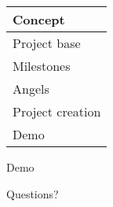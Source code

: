 \documentclass{beamer}
\begin{document}
\begin{frame}
	\begin{tabularx}{\textwidth}{X}
		\hline
		Concept\\
		\hline
		Project base\\
		\hline
		Milestones\\
		\hline
		Angels\\
		\hline
		Project creation\\
		\hline
		\rowcolor{hcolor}
		Demo\\
		\hline
	\end{tabularx}
\end{frame}



\begin{frame}
	\begin{center}
		\huge{Demo}
	\end{center}
\end{frame}



\begin{frame}
	\begin{center}
		\huge{Questions?}
	\end{center}
\end{frame}
\end{document}
